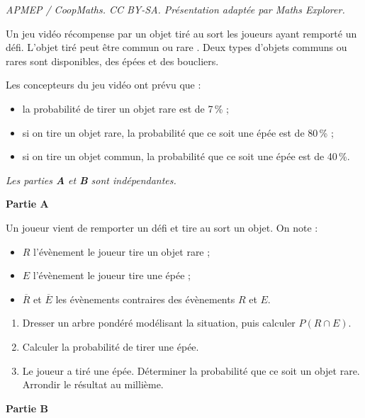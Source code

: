 \documentclass[10pt]{article}
\begin{document}
\noindent\textit{APMEP / CoopMaths. CC BY-SA. Présentation adaptée par Maths Explorer.}\par\medskip
\medskip

Un jeu vidéo récompense par un objet tiré au sort les joueurs ayant remporté un défi. L'objet tiré peut être \og commun \fg{} ou \og rare \fg. Deux types d'objets communs ou rares sont disponibles, des épées et des boucliers.

Les concepteurs du jeu vidéo ont prévu que :

\begin{itemize}
\item la probabilité de tirer un objet rare est de 7\,\% ;
\item si on tire un objet rare, la probabilité que ce soit une épée est de 80\,\% ;
\item si on tire un objet commun, la probabilité que ce soit une épée est de 40\,\%.
\end{itemize}

\emph{Les parties \textbf{\rm A} et \textbf{\rm B} sont indépendantes.}

\bigskip

\textbf{Partie A}

\medskip

Un joueur vient de remporter un défi et tire au sort un objet. On note :

\begin{itemize}[label=$\bullet~$]
\item $R$ l'évènement \og le joueur tire un objet rare\fg{} ;
\item $E$ l'évènement \og le joueur tire une épée \fg{} ;
\item $\overline{R}$ et $\overline{E}$ les évènements contraires des évènements $R$ et $E$.
\end{itemize}

\medskip

\begin{enumerate}
\item Dresser un arbre pondéré modélisant la situation, puis calculer $P(R \cap E)$.
\item Calculer la probabilité de tirer une épée.
\item Le joueur a tiré une épée. Déterminer la probabilité que ce soit un objet rare. Arrondir
le résultat au millième.
\end{enumerate}

\bigskip

\textbf{Partie B}
\end{document}
